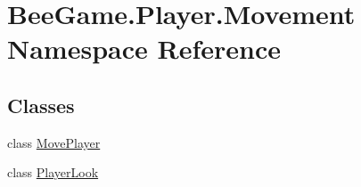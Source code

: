 \hypertarget{namespace_bee_game_1_1_player_1_1_movement}{}\section{Bee\+Game.\+Player.\+Movement Namespace Reference}
\label{namespace_bee_game_1_1_player_1_1_movement}
\subsection*{Classes}
\begin{DoxyCompactItemize}
\item 
class \hyperlink{class_bee_game_1_1_player_1_1_movement_1_1_move_player}{Move\+Player}
\item 
class \hyperlink{class_bee_game_1_1_player_1_1_movement_1_1_player_look}{Player\+Look}
\end{DoxyCompactItemize}
